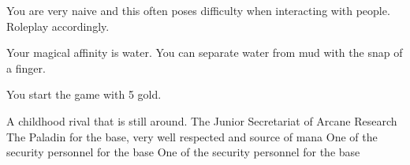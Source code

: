 \documentclass[char]{guildcamp3}
\begin{document}
\begin{itemz}[Notes]
	\item You are very naive and this often poses difficulty when interacting with people. Roleplay accordingly. 
	\item Your magical affinity is water. You can separate water from mud with the snap of a finger.
	\item You start the game with 5 gold. 
\end{itemz}

\begin{contacts}
  \contact{\cMageTwo{}} A childhood rival that is still around.
  \contact{\cNobleTwo{}} The Junior Secretariat of Arcane Research
  \contact{\cPaladin{}} The Paladin for the base, very well respected and source of mana 
  \contact{\cRogueOne{}} One of the security personnel for the base
  \contact{\cRogueTwo{}} One of the security personnel for the base
\end{contacts}
\end{document}
